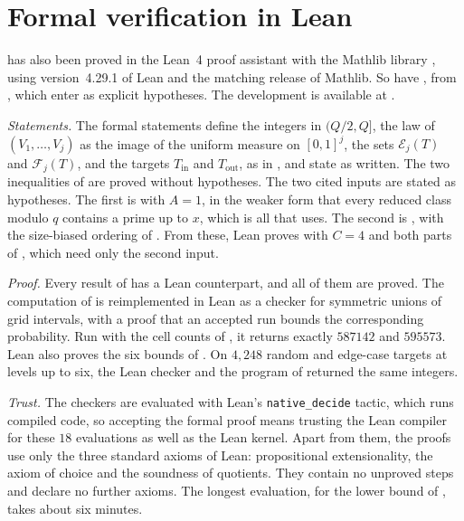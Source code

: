 \documentclass[11pt,colorlinks]{charlie}
\newcommand{\Tin}{T_{\mathrm{in}}}
\newcommand{\Tout}{T_{\mathrm{out}}}
\newcommand{\cE}{\mathcal{E}}
\newcommand{\cF}{\mathcal{F}}
\begin{document}
\section{Formal verification in Lean}\label{sec:lean}
 has also been proved in the Lean~4 proof assistant \cite{Lean4} with the Mathlib library \cite{Mathlib}, using version~4.29.1 of Lean and the matching release of Mathlib. So have , from , which enter as explicit hypotheses. The development is available at \coderepo.

\emph{Statements.} The formal statements define the integers in $(Q/2,Q]$, the law of $(V_1,\dots,V_j)$ as the image of the uniform measure on $[0,1]^j$, the sets $\cE_j(T)$ and $\cF_j(T)$, and the targets $\Tin$ and $\Tout$, as in , and state  as written. The two inequalities of  are proved without hypotheses. The two cited inputs are stated as hypotheses. The first is  with $A=1$, in the weaker form that every reduced class modulo $q$ contains a prime up to $x$, which is all that  uses. The second is , with the size-biased ordering of . From these, Lean proves  with $C=4$ and both parts of , which need only the second input.

\emph{Proof.} Every result of  has a Lean counterpart, and all of them are proved. The computation of  is reimplemented in Lean as a checker for symmetric unions of grid intervals, with a proof that an accepted run bounds the corresponding probability. Run with the cell counts of , it returns exactly $587142$ and $595573$. Lean also proves the six bounds of . On $4{,}248$ random and edge-case targets at levels up to six, the Lean checker and the program of  returned the same integers.

\emph{Trust.} The checkers are evaluated with Lean's \texttt{native\_decide} tactic, which runs compiled code, so accepting the formal proof means trusting the Lean compiler for these $18$ evaluations as well as the Lean kernel. Apart from them, the proofs use only the three standard axioms of Lean: propositional extensionality, the axiom of choice and the soundness of quotients. They contain no unproved steps and declare no further axioms. The longest evaluation, for the lower bound of , takes about six minutes.
\end{document}
